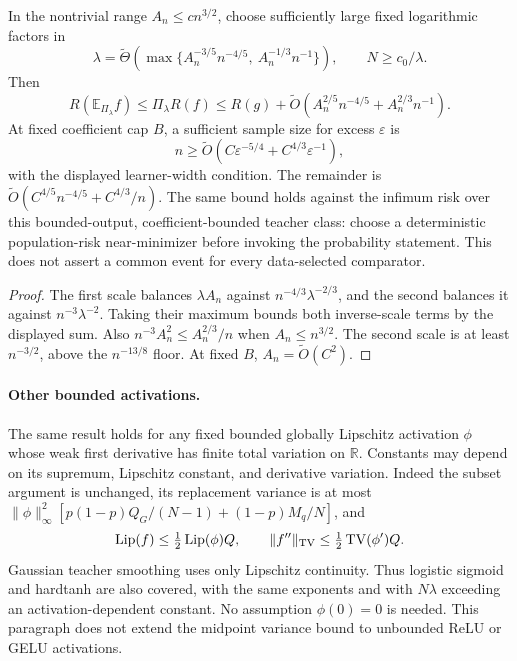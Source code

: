 \begin{corollary}
\label{cor:tanh-midpoint-poly}
In the nontrivial range $A_n\le c n^{3/2}$, choose sufficiently large
fixed logarithmic factors in
\[
 \lambda=\widetilde\Theta\left(
 \max\{A_n^{-3/5}n^{-4/5},\ A_n^{-1/3}n^{-1}\}\right),
 \qquad N\ge c_0/\lambda.
\]
Then
\[
 R(\mathbb E_{\Pi_\lambda}f)\le\Pi_\lambda R(f)
 \le R(g)+\widetilde O\left(A_n^{2/5}n^{-4/5}
                         +A_n^{2/3}n^{-1}\right).        \tag{TM8}
\]
At fixed coefficient cap $B$, a sufficient sample size for excess
$\varepsilon$ is
\[
 n\ge\widetilde O\left(C\varepsilon^{-5/4}
                         +C^{4/3}\varepsilon^{-1}\right),             \tag{TM9}
\]
with the displayed learner-width condition. The remainder is
$\widetilde O(C^{4/5}n^{-4/5}+C^{4/3}/n)$.
The same bound holds against the infimum risk over this bounded-output,
coefficient-bounded teacher class: choose a deterministic population-risk
near-minimizer before invoking the probability statement. This does not
assert a common event for every data-selected comparator.
\end{corollary}
\begin{proof}
The first scale balances $\lambda A_n$ against
$n^{-4/3}\lambda^{-2/3}$, and the second balances it against
$n^{-3}\lambda^{-2}$. Taking their maximum bounds both inverse-scale
terms by the displayed sum. Also $n^{-3}A_n^2\le A_n^{2/3}/n$ when
$A_n\le n^{3/2}$. The second scale is at least $n^{-3/2}$, above
the $n^{-13/8}$ floor. At fixed $B$, $A_n=\widetilde O(C^2)$.
\end{proof}

\paragraph{Other bounded activations.}
The same result holds for any fixed bounded globally Lipschitz activation
$\phi$ whose weak first derivative has finite total variation on
$\mathbb R$. Constants may depend on its supremum, Lipschitz constant,
and derivative variation. Indeed the subset argument is unchanged,
its replacement variance is at most
$\|\phi\|_\infty^2[p(1-p)Q_G/(N-1)+(1-p)M_q/N]$,
and
\[
 \operatorname{Lip}(f)\le\tfrac12\operatorname{Lip}(\phi)Q,
 \qquad
 \|f''\|_{\rm TV}\le\tfrac12\operatorname{TV}(\phi')Q.
\]
Gaussian teacher smoothing uses only Lipschitz continuity. Thus logistic
sigmoid and hardtanh are also covered, with the same exponents and
with $N\lambda$ exceeding an activation-dependent constant.
No assumption $\phi(0)=0$ is needed. This paragraph does not extend
the midpoint variance bound to unbounded ReLU or GELU activations.

